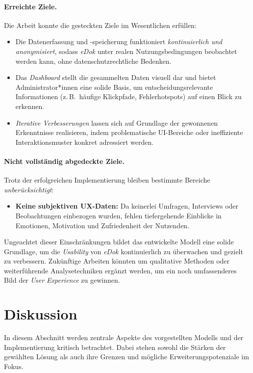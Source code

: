 \documentclass[12pt,oneside]{article}
\begin{document}
\paragraph{Erreichte Ziele.} 
Die Arbeit konnte die gesteckten Ziele im Wesentlichen erfüllen:
\begin{itemize}
    \item Die Datenerfassung und -speicherung funktioniert \emph{kontinuierlich und anonymisiert}, sodass \textit{eDok} unter realen Nutzungsbedingungen beobachtet werden kann, ohne datenschutzrechtliche Bedenken.
    \item Das \emph{Dashboard} stellt die gesammelten Daten visuell dar und bietet Administrator*innen eine solide Basis, um entscheidungsrelevante Informationen (z.\,B.\ häufige Klickpfade, Fehlerhotspots) auf einen Blick zu erkennen.
    \item \emph{Iterative Verbesserungen} lassen sich auf Grundlage der gewonnenen Erkenntnisse realisieren, indem problematische UI-Bereiche oder ineffiziente Interaktionsmuster konkret adressiert werden.
\end{itemize}

\paragraph{Nicht vollständig abgedeckte Ziele.}
Trotz der erfolgreichen Implementierung bleiben bestimmte Bereiche \emph{unberücksichtigt}:
\begin{itemize}
    \item \textbf{Keine subjektiven UX-Daten:} Da keinerlei Umfragen, Interviews oder Beobachtungen einbezogen wurden, fehlen tiefergehende Einblicke in Emotionen, Motivation und Zufriedenheit der Nutzenden.
\end{itemize}

Ungeachtet dieser Einschränkungen bildet das entwickelte Modell eine solide Grundlage, um die \emph{Usability} von \textit{eDok} kontinuierlich zu überwachen und gezielt zu verbessern. Zukünftige Arbeiten könnten um qualitative Methoden oder weiterführende Analysetechniken ergänzt werden, um ein noch umfassenderes Bild der \emph{User Experience} zu gewinnen.
\section{Diskussion}
\label{sec:diskussion}

In diesem Abschnitt werden zentrale Aspekte des vorgestellten Modells und der Implementierung kritisch betrachtet. Dabei stehen sowohl die Stärken der gewählten Lösung als auch ihre Grenzen und mögliche Erweiterungspotenziale im Fokus.
\end{document}

